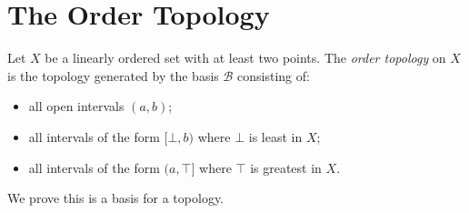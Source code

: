 \section{The Order Topology}

\begin{definition}
    Let $X$ be a linearly ordered set with at least two points. The \emph{order topology} on $X$ is the topology
    generated by the basis $\mathcal{B}$ consisting of:
    \begin{itemize}
        \item all open intervals $(a,b)$;
        \item all intervals of the form $[\bot,b)$ where $\bot$ is least in $X$;
        \item all intervals of the form $(a,\top]$ where $\top$ is greatest in $X$.
    \end{itemize}
\end{definition}

We prove this is a basis for a topology.

